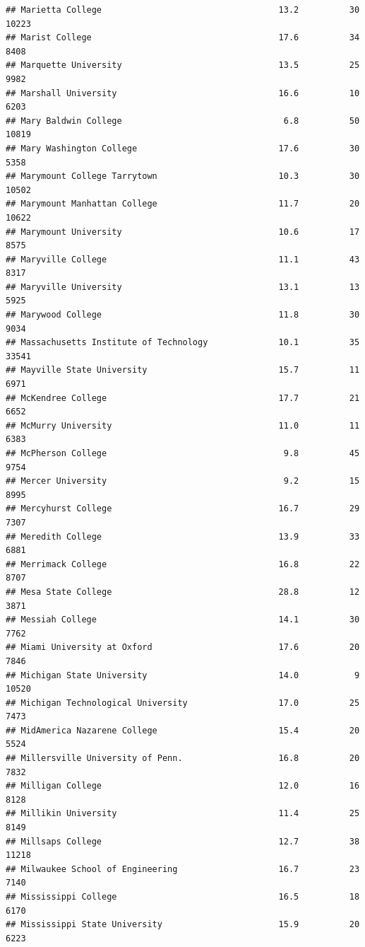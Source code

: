 \documentclass[
]{article}
\begin{document}
\begin{verbatim}
## Marietta College                                   13.2          30  10223
## Marist College                                     17.6          34   8408
## Marquette University                               13.5          25   9982
## Marshall University                                16.6          10   6203
## Mary Baldwin College                                6.8          50  10819
## Mary Washington College                            17.6          30   5358
## Marymount College Tarrytown                        10.3          30  10502
## Marymount Manhattan College                        11.7          20  10622
## Marymount University                               10.6          17   8575
## Maryville College                                  11.1          43   8317
## Maryville University                               13.1          13   5925
## Marywood College                                   11.8          30   9034
## Massachusetts Institute of Technology              10.1          35  33541
## Mayville State University                          15.7          11   6971
## McKendree College                                  17.7          21   6652
## McMurry University                                 11.0          11   6383
## McPherson College                                   9.8          45   9754
## Mercer University                                   9.2          15   8995
## Mercyhurst College                                 16.7          29   7307
## Meredith College                                   13.9          33   6881
## Merrimack College                                  16.8          22   8707
## Mesa State College                                 28.8          12   3871
## Messiah College                                    14.1          30   7762
## Miami University at Oxford                         17.6          20   7846
## Michigan State University                          14.0           9  10520
## Michigan Technological University                  17.0          25   7473
## MidAmerica Nazarene College                        15.4          20   5524
## Millersville University of Penn.                   16.8          20   7832
## Milligan College                                   12.0          16   8128
## Millikin University                                11.4          25   8149
## Millsaps College                                   12.7          38  11218
## Milwaukee School of Engineering                    16.7          23   7140
## Mississippi College                                16.5          18   6170
## Mississippi State University                       15.9          20   6223

\end{verbatim}
\end{document}
